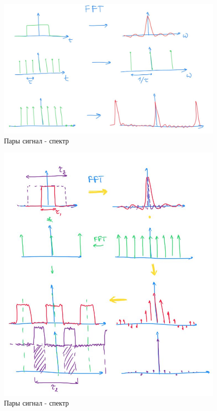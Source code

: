 \begin{figure}[H]
	\centering
	\includegraphics[scale=0.8]{images/FFT1}
	\caption{Пары сигнал - спектр}
	\label{fig:FFT1}
\end{figure}

\begin{figure}[H]
	\centering
	\includegraphics[scale=0.8]{images/FFT2}
	\caption{Пары сигнал - спектр}
	\label{fig:FFT2}
\end{figure}

